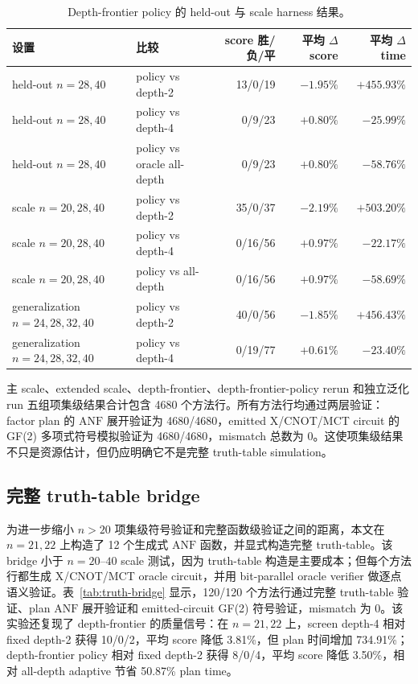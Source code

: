 \documentclass[UTF8,fontset=macnew,11pt]{ctexart}
\newcommand{\anf}{\ensuremath{\mathrm{ANF}}}
\newcommand{\ttable}{truth-table}
\begin{document}
\begin{table}[H]
\centering
\scriptsize
\caption{Depth-frontier policy 的 held-out 与 scale harness 结果。}
\label{tab:frontier-policy}
\begin{tabular}{llrrr}
\toprule
设置 & 比较 & score 胜/负/平 & 平均 $\Delta$ score & 平均 $\Delta$ time \\
\midrule
held-out $n=28,40$ & policy vs depth-2 & 13/0/19 & $-1.95\%$ & $+455.93\%$ \\
held-out $n=28,40$ & policy vs depth-4 & 0/9/23 & $+0.80\%$ & $-25.99\%$ \\
held-out $n=28,40$ & policy vs oracle all-depth & 0/9/23 & $+0.80\%$ & $-58.76\%$ \\
scale $n=20,28,40$ & policy vs depth-2 & 35/0/37 & $-2.19\%$ & $+503.20\%$ \\
scale $n=20,28,40$ & policy vs depth-4 & 0/16/56 & $+0.97\%$ & $-22.17\%$ \\
scale $n=20,28,40$ & policy vs all-depth & 0/16/56 & $+0.97\%$ & $-58.69\%$ \\
generalization $n=24,28,32,40$ & policy vs depth-2 & 40/0/56 & $-1.85\%$ & $+456.43\%$ \\
generalization $n=24,28,32,40$ & policy vs depth-4 & 0/19/77 & $+0.61\%$ & $-23.40\%$ \\
\bottomrule
\end{tabular}
\end{table}

主 scale、extended scale、depth-frontier、depth-frontier-policy rerun 和独立泛化 run 五组项集级结果合计包含 4680 个方法行。所有方法行均通过两层验证：factor plan 的 \anf{} 展开验证为 4680/4680，emitted X/CNOT/MCT circuit 的 GF(2) 多项式符号模拟验证为 4680/4680，mismatch 总数为 0。这使项集级结果不只是资源估计，但仍应明确它不是完整 \ttable{} simulation。

\subsection{完整 truth-table bridge}

为进一步缩小 $n>20$ 项集级符号验证和完整函数级验证之间的距离，本文在 $n=21,22$ 上构造了 12 个生成式 \anf{} 函数，并显式构造完整 \ttable{}。该 bridge 小于 $n=20$--$40$ scale 测试，因为 truth-table 构造是主要成本；但每个方法行都生成 X/CNOT/MCT oracle circuit，并用 bit-parallel oracle verifier 做逐点语义验证。表~\ref{tab:truth-bridge} 显示，120/120 个方法行通过完整 \ttable{} 验证、plan \anf{} 展开验证和 emitted-circuit GF(2) 符号验证，mismatch 为 0。该实验还复现了 depth-frontier 的质量信号：在 $n=21,22$ 上，screen depth-4 相对 fixed depth-2 获得 10/0/2，平均 score 降低 3.81\%，但 plan 时间增加 734.91\%；depth-frontier policy 相对 fixed depth-2 获得 8/0/4，平均 score 降低 3.50\%，相对 all-depth adaptive 节省 50.87\% plan time。
\end{document}
